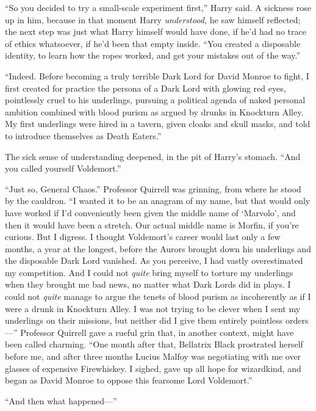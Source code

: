 “So you decided to try a small-scale experiment first,” Harry said. A sickness rose up in him, because in that moment Harry \emph{understood,} he saw himself reflected; the next step was just what Harry himself would have done, if he’d had no trace of ethics whatsoever, if he’d been that empty inside. “You created a disposable identity, to learn how the ropes worked, and get your mistakes out of the way.”

“Indeed. Before becoming a truly terrible Dark Lord for David Monroe to fight, I first created for practice the persona of a Dark Lord with glowing red eyes, pointlessly cruel to his underlings, pursuing a political agenda of naked personal ambition combined with blood purism as argued by drunks in Knockturn Alley. My first underlings were hired in a tavern, given cloaks and skull masks, and told to introduce themselves as Death Eaters.”

The sick sense of understanding deepened, in the pit of Harry’s stomach. “And you called yourself Voldemort.”

“Just so, General Chaos.” Professor Quirrell was grinning, from where he stood by the cauldron. “I wanted it to be an anagram of my name, but that would only have worked if I’d conveniently been given the middle name of ‘Marvolo’, and then it would have been a stretch. Our actual middle name is Morfin, if you’re curious. But I digress. I thought Voldemort’s career would last only a few months, a year at the longest, before the Aurors brought down his underlings and the disposable Dark Lord vanished. As you perceive, I had vastly overestimated my competition. And I could not \emph{quite} bring myself to torture my underlings when they brought me bad news, no matter what Dark Lords did in plays. I could not \emph{quite} manage to argue the tenets of blood purism as incoherently as if I were a drunk in Knockturn Alley. I was not trying to be clever when I sent my underlings on their missions, but neither did I give them entirely pointless orders—” Professor Quirrell gave a rueful grin that, in another context, might have been called charming. “One month after that, Bellatrix Black prostrated herself before me, and after three months Lucius Malfoy was negotiating with me over glasses of expensive Firewhiskey. I sighed, gave up all hope for wizardkind, and began as David Monroe to oppose this fearsome Lord Voldemort.”

“And then what happened—”

